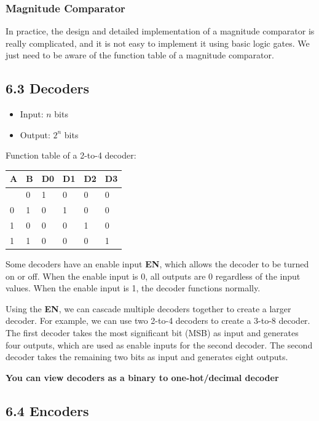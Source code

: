 \documentclass[11pt,a4paper]{article}
\providecommand{\tightlist}{\setlength{\itemsep}{1pt}\setlength{\parskip}{0pt}}
\begin{document}
\subsubsection{Magnitude Comparator}\label{magnitude-comparator}

In practice, the design and detailed implementation of a magnitude
comparator is really complicated, and it is not easy to implement it
using basic logic gates. We just need to be aware of the function table
of a magnitude comparator.

\subsection{6.3 Decoders}\label{decoders}

\begin{itemize}
\tightlist
\item
  Input: \(n\) bits
\item
  Output: \(2^n\) bits
\end{itemize}

Function table of a 2-to-4 decoder:

\begin{longtable}[]{@{}llllll@{}}
\toprule\noalign{}
A & B & D0 & D1 & D2 & D3 \\
\midrule\noalign{}
\endhead
\bottomrule\noalign{}
\endlastfoot
0 & 0 & 1 & 0 & 0 & 0 \\
0 & 1 & 0 & 1 & 0 & 0 \\
1 & 0 & 0 & 0 & 1 & 0 \\
1 & 1 & 0 & 0 & 0 & 1 \\
\end{longtable}

Some decoders have an enable input \textbf{EN}, which allows the decoder
to be turned on or off. When the enable input is 0, all outputs are 0
regardless of the input values. When the enable input is 1, the decoder
functions normally.

Using the \textbf{EN}, we can cascade multiple decoders together to
create a larger decoder. For example, we can use two 2-to-4 decoders to
create a 3-to-8 decoder. The first decoder takes the most significant
bit (MSB) as input and generates four outputs, which are used as enable
inputs for the second decoder. The second decoder takes the remaining
two bits as input and generates eight outputs.

\textbf{You can view decoders as a binary to one-hot/decimal decoder}

\subsection{6.4 Encoders}\label{encoders}
\end{document}
